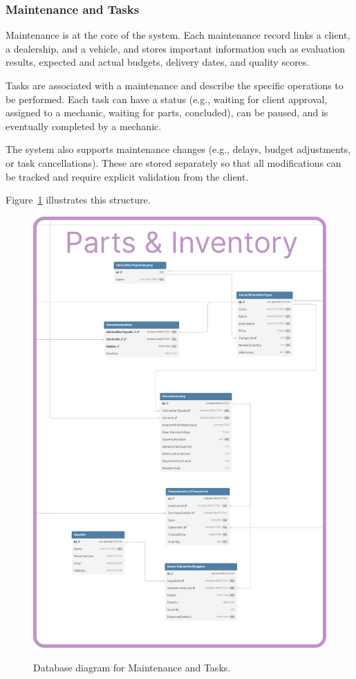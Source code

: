 \subsubsection{Maintenance and Tasks} 


Maintenance is at the core of the system. Each maintenance record links a client, a dealership, and a vehicle, and stores important information such as evaluation results, expected and actual budgets, delivery dates, and quality scores.

Tasks are associated with a maintenance and describe the specific operations to be performed. Each task can have a status (e.g., waiting for client approval, assigned to a mechanic, waiting for parts, concluded), can be paused, and is eventually completed by a mechanic.

The system also supports maintenance changes (e.g., delays, budget adjustments, or task cancellations). These are stored separately so that all modifications can be tracked and require explicit validation from the client.

Figure~\ref{fig:dbMaintenance} illustrates this structure.

\begin{figure}[h]
  \caption{Database diagram for Maintenance and Tasks.}
  \centering
  \includegraphics[width=\textwidth]{figs/dbDiagrams/Maintenance_and_Tasks}
  \label{fig:dbMaintenance}
\end{figure}



